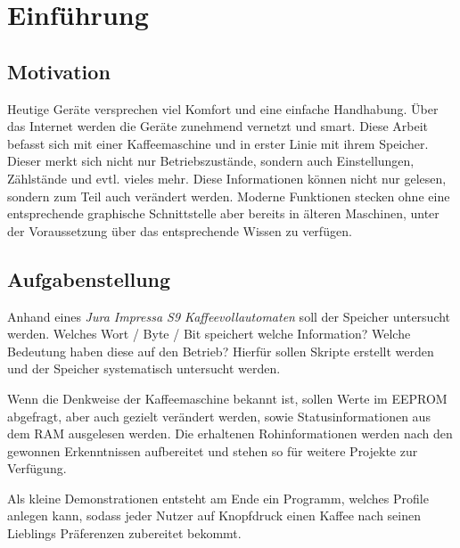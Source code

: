 \chapter{Einführung}

\section{Motivation}
Heutige Geräte versprechen viel Komfort und eine einfache Handhabung. Über das Internet werden die Geräte zunehmend vernetzt und smart.
Diese Arbeit befasst sich mit einer Kaffeemaschine und in erster Linie mit ihrem Speicher. Dieser merkt sich nicht nur Betriebszustände,
sondern auch Einstellungen, Zählstände und evtl. vieles mehr. Diese Informationen können nicht nur gelesen, sondern zum Teil auch verändert werden.
Moderne Funktionen stecken ohne eine entsprechende graphische Schnittstelle aber bereits in älteren Maschinen, unter der Voraussetzung über das entsprechende Wissen zu verfügen.

\section{Aufgabenstellung}
Anhand eines \textit{Jura Impressa S9 Kaffeevollautomaten} soll der Speicher untersucht werden.
Welches Wort / Byte / Bit speichert welche Information? Welche Bedeutung haben diese auf den Betrieb?
Hierfür sollen Skripte erstellt werden und der Speicher systematisch untersucht werden.

Wenn die Denkweise der Kaffeemaschine bekannt ist, sollen Werte im \ac{EEPROM} abgefragt, aber auch gezielt verändert werden, sowie Statusinformationen aus dem \ac{RAM} ausgelesen werden. Die erhaltenen Rohinformationen werden nach den gewonnen Erkenntnissen aufbereitet und stehen so für weitere Projekte zur Verfügung.

Als kleine Demonstrationen entsteht am Ende ein Programm, welches Profile anlegen kann, sodass jeder Nutzer auf Knopfdruck einen Kaffee nach seinen Lieblings Präferenzen zubereitet bekommt.
